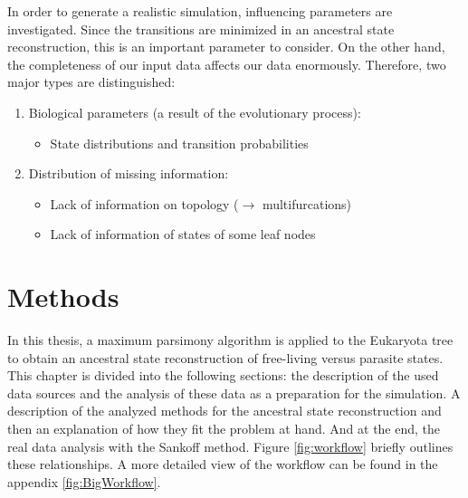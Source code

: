   In order to generate a realistic simulation, influencing parameters are investigated. Since the 
    transitions are minimized in an ancestral state reconstruction, this is an important parameter 
    to consider. On the other hand, the completeness of our input data affects our data enormously.
    Therefore, two major types are distinguished:
  \begin{enumerate}
    \item Biological parameters (a result of the evolutionary process):
      \begin{itemize}
        \item State distributions and transition probabilities
      \end{itemize}
    \item Distribution of missing information:
      \begin{itemize}
        \item Lack of information on topology ($\rightarrow$ multifurcations)
        \item Lack of information of states of some leaf nodes
      \end{itemize}
  \end{enumerate}

\chapter{Methods}
  In this thesis, a maximum parsimony algorithm is applied to the Eukaryota tree to obtain an 
    ancestral state reconstruction of free-living versus parasite states. This chapter is divided 
    into the following sections: the description of the used data sources and the analysis of these 
    data as a preparation for the simulation. A description of the analyzed methods for the 
    ancestral state reconstruction and then an explanation of how they fit the problem at hand. And 
    at the end, the real data analysis with the Sankoff method. Figure \ref{fig:workflow} briefly 
    outlines these relationships. A more detailed view of the workflow can be found in the appendix 
    \ref{fig:BigWorkflow}.

